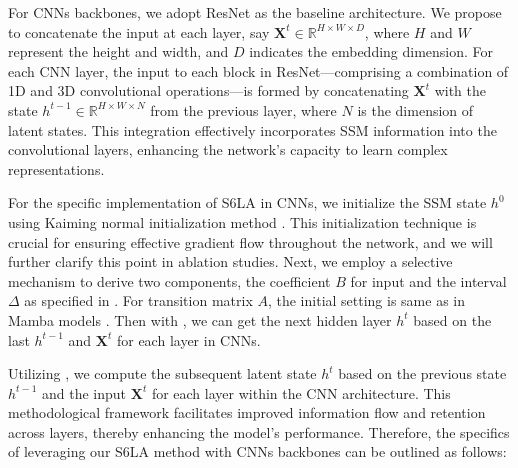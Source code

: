 For CNNs backbones, we adopt ResNet \citep{he2016deep} as the baseline architecture. We propose to concatenate the input at each layer, say $\boldsymbol{X}^t \in \mathbb{R}^{H \times W \times D}$, where $H$ and $W$ represent the height and width, and $D$ indicates the embedding dimension. For each CNN layer, the input to each block in ResNet—comprising a combination of 1D and 3D convolutional operations—is formed by concatenating $\boldsymbol{X}^{t}$ with the state $h^{t-1} \in \mathbb{R}^{H \times W \times N}$ from the previous layer, where $N$ is the dimension of latent states. This integration effectively incorporates SSM information into the convolutional layers, enhancing the network's capacity to learn complex representations. 

For the specific implementation of S6LA in CNNs, we initialize the SSM state $h^0$ using Kaiming normal initialization method \citep{he2015delving}. This initialization technique is crucial for ensuring effective gradient flow throughout the network, and we will further clarify this point in ablation studies. Next, we employ a selective mechanism to derive two components, the coefficient $B$ for input and the interval $\Delta$ as specified in . For transition matrix $A$, the initial setting is same as in Mamba models \citep{gu2023mamba}. Then with , we can get the next hidden layer $h^{t}$ based on the last $h^{t-1}$ and $\boldsymbol{X}^{t}$ for each layer in CNNs.

Utilizing , we compute the subsequent latent state $h^{t}$ based on the previous state $h^{t-1}$ and the input $\boldsymbol{X}^{t}$ for each layer within the CNN architecture. This methodological framework facilitates improved information flow and retention across layers, thereby enhancing the model's performance. Therefore, the specifics of leveraging our S6LA method with CNNs backbones can be outlined as follows:

